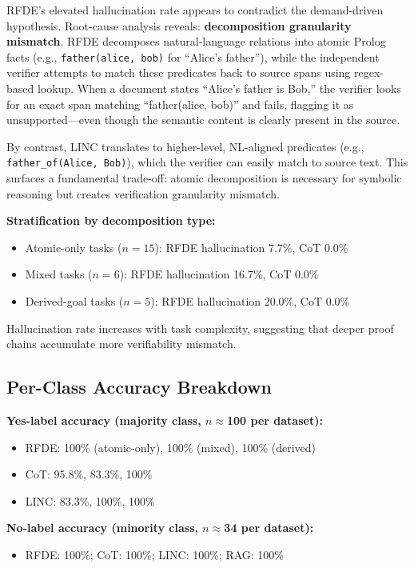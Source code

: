 \documentclass[11pt,letterpaper]{article}
\begin{document}
RFDE's elevated hallucination rate appears to contradict the demand-driven hypothesis. Root-cause analysis reveals: \textbf{decomposition granularity mismatch}. RFDE decomposes natural-language relations into atomic Prolog facts (e.g., \texttt{father(alice, bob)} for ``Alice's father''), while the independent verifier attempts to match these predicates back to source spans using regex-based lookup. When a document states ``Alice's father is Bob,'' the verifier looks for an exact span matching ``father(alice, bob)'' and fails, flagging it as unsupported---even though the semantic content is clearly present in the source.

By contrast, LINC translates to higher-level, NL-aligned predicates (e.g., \texttt{father\_of(Alice, Bob)}), which the verifier can easily match to source text. This surfaces a fundamental trade-off: atomic decomposition is necessary for symbolic reasoning but creates verification granularity mismatch.

\textbf{Stratification by decomposition type:}
\begin{itemize}
  \item Atomic-only tasks ($n=15$): RFDE hallucination 7.7\%, CoT 0.0\%
  \item Mixed tasks ($n=6$): RFDE hallucination 16.7\%, CoT 0.0\%
  \item Derived-goal tasks ($n=5$): RFDE hallucination 20.0\%, CoT 0.0\%
\end{itemize}

Hallucination rate increases with task complexity, suggesting that deeper proof chains accumulate more verifiability mismatch.

\subsection{Per-Class Accuracy Breakdown}

\textbf{Yes-label accuracy (majority class, $n\approx$100 per dataset):}
\begin{itemize}
  \item RFDE: 100\% (atomic-only), 100\% (mixed), 100\% (derived)
  \item CoT: 95.8\%, 83.3\%, 100\%
  \item LINC: 83.3\%, 100\%, 100\%
\end{itemize}

\textbf{No-label accuracy (minority class, $n\approx$34 per dataset):}
\begin{itemize}
  \item RFDE: 100\%; CoT: 100\%; LINC: 100\%; RAG: 100\%
\end{itemize}
\end{document}
